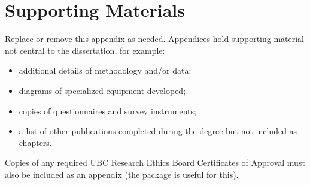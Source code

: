 
\chapter{Supporting Materials}

Replace or remove this appendix as needed.  Appendices hold
supporting material not central to the dissertation, for example:
\begin{itemize}
\item additional details of methodology and/or data;
\item diagrams of specialized equipment developed;
\item copies of questionnaires and survey instruments;
\item a list of other publications completed during the degree but
not included as chapters.
\end{itemize}

Copies of any required UBC Research Ethics Board Certificates of
Approval must also be included as an appendix (the
 package is useful for this).
